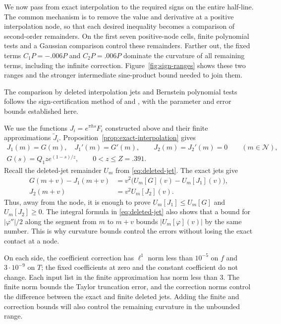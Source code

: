 \documentclass[11pt]{article}
\theoremstyle{remark}\newtheorem{remark}[theorem]{Remark}
\begin{document}
We now pass from exact interpolation to the required signs on the entire
half-line. The common mechanism is to remove the value and derivative at
a positive interpolation node, so that each desired inequality becomes
a comparison of second-order remainders. On the first seven positive-node
cells, finite polynomial tests and a Gaussian comparison control these
remainders. Farther out, the fixed terms $C_1P=-.006P$ and $C_2P=.006P$
dominate the curvature of all remaining terms, including the infinite
correction. Figure~\ref{fig:sign-ranges} shows these two ranges and the
stronger intermediate sine-product bound needed to join them.

The comparison by deleted interpolation jets and Bernstein polynomial
tests follows the sign-certification method of
\cite[Section~4, especially Section~4.2]{SharpPlanar2026} and
\cite[Sections~3.4--3.6 and~5.1--5.3]{UniversalTriangular2026}, with the
parameter and error bounds established here.

We use the functions $J_i=e^{\pi hs}F_i$ constructed above and their
finite approximations $\widetilde J_i$.
Proposition~\ref{prop:exact-interpolation} gives
\begin{equation}\label{eq:sign-exact-jets}
 \begin{gathered}
 J_1(m)=G(m),\quad J_1'(m)=G'(m),\qquad
 J_2(m)=J_2'(m)=0\qquad(m\in\mathcal N),\\
 G(s)=Q_1z e^{(1-s)/z},\qquad 0<z\le Z=.391.
 \end{gathered}
\end{equation}
Recall the deleted-jet remainder $U_m$ from \eqref{eq:deleted-jet}.
The exact jets give
\begin{equation}\label{eq:sign-deleted-identities}
 \begin{split}
 G(m+v)-J_1(m+v)
   &=v^2\bigl(U_m[G](v)-U_m[J_1](v)\bigr),\\
 J_2(m+v)&=v^2U_m[J_2](v).
 \end{split}
\end{equation}
Thus, away from the node, it is enough to prove
$U_m[J_1]\le U_m[G]$ and $U_m[J_2]\ge0$.
The integral formula in \eqref{eq:deleted-jet} also shows that a bound
for $|\varphi''|/2$ along the segment from $m$ to $m+v$ bounds
$|U_m[\varphi](v)|$ by the same number. This is why curvature bounds
control the errors without losing the exact contact at a node.

On each side, the coefficient correction has $\ell^1$ norm less than
$10^{-5}$ on $f$ and $3\cdot10^{-9}$ on $T$; the fixed coefficients
at zero and the constant coefficient do not change. Each input list
in the finite approximation has norm less than $3$. The finite norm
bounds the Taylor truncation error, and the correction norms control
the difference between the exact and finite deleted jets. Adding the
finite and correction bounds will also control the remaining curvature
in the unbounded range.
\end{document}
